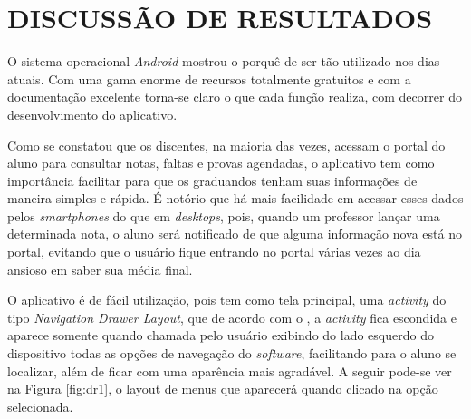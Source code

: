 
\chapter{DISCUSSÃO DE RESULTADOS} 

	\par O sistema operacional \textit{Android} mostrou o porquê de ser tão
utilizado nos dias atuais. Com uma gama enorme de recursos totalmente gratuitos
e com a documentação excelente torna-se claro o que cada função realiza, com
decorrer do desenvolvimento do aplicativo.

	\par Como se constatou que os discentes, na maioria das vezes, acessam o portal
do aluno para consultar notas, faltas e provas agendadas, o aplicativo tem como
importância facilitar para que os graduandos tenham suas informações de maneira
simples e rápida. É notório que há mais facilidade em acessar esses dados pelos
\textit{smartphones} do que em \textit{desktops}, pois, quando um professor
lançar uma determinada nota, o aluno será notificado de que alguma informação
nova está no portal, evitando que o usuário fique entrando no portal várias
vezes ao dia ansioso em saber sua média final.
	
	\par O aplicativo é de fácil utilização, pois tem como tela principal, uma
\textit{activity} do tipo \textit{Navigation Drawer Layout}, que de acordo com
o , a \textit{activity} fica escondida e aparece somente quando
chamada pelo usuário exibindo do lado esquerdo do dispositivo todas as opções
de navegação do \textit{software}, facilitando para o aluno se localizar, além
de ficar com uma aparência mais agradável. A seguir pode-se ver na Figura
\ref{fig:dr1}, o layout de menus que aparecerá quando clicado na opção
selecionada.
 

